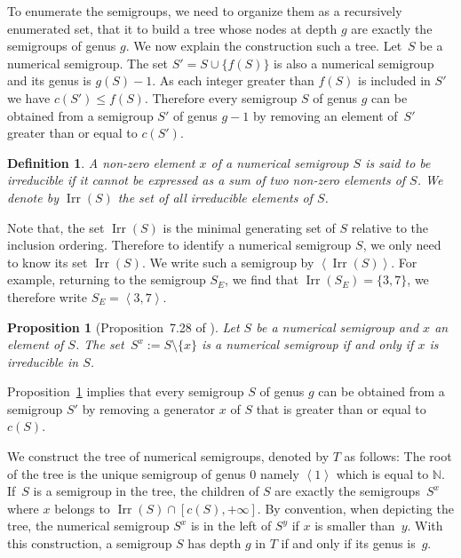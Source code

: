 \documentclass{deliverablereport}
\newcommand{\NN}{\mathbb{N}}
\DeclareMathOperator{\Irr}{Irr}
\newtheorem{defi}{Definition}
\newtheorem{prop}{Proposition}
\begin{document}
%
To enumerate the semigroups, we need to organize them as a recursively
enumerated set, that it to build a tree whose nodes at depth $g$ are exactly
the semigroups of genus $g$.  We now explain the construction such a tree.
Let~$S$ be a numerical semigroup. The set $S'=S\cup\{f(S)\}$ is also a
numerical semigroup and its genus is $g(S)-1$.  As each integer greater than
$f(S)$ is included in $S'$ we have $c(S')\leq f(S)$.  Therefore every
semigroup $S$ of genus $g$ can be obtained from a semigroup $S'$ of genus
$g-1$ by removing an element of~$S'$ greater than or equal to $c(S')$.

\begin{defi}
  A non-zero element $x$ of a numerical semigroup $S$ is said to be
  \emph{irreducible} if it cannot be expressed as a sum of two non-zero
  elements of $S$.  We denote by $\Irr(S)$ the set of all irreducible elements
  of $S$.
\end{defi}
Note that, the set $\Irr(S)$ is the minimal generating set of $S$ relative
to the inclusion ordering. Therefore to identify a numerical semigroup $S$, we
only need to know its set $\Irr(S)$. We write such a semigroup by
$\left<\Irr(S)\right>$. For example, returning to the semigroup $S_E$, we find
that $\Irr(S_E) = \{3, 7\}$, we therefore write $S_E=\left<3,7\right>$.

\begin{prop}[Proposition~7.28 of \cite{BookNS}]
  \label{P:Sx}
  Let $S$ be a numerical semigroup and $x$ an element of $S$. The
  set~$S^x:=S\setminus\{x\}$ is a numerical semigroup if and only if $x$ is
  irreducible in $S$.
\end{prop}
Proposition~\ref{P:Sx} implies that every semigroup $S$ of genus $g$ can be
obtained from a semigroup $S'$ by removing a generator $x$ of $S$ that is
greater than or equal to $c(S)$.

We construct the tree of numerical semigroups, denoted by $T$ as follows: The
root of the tree is the unique semigroup of genus $0$ namely $\left<1\right>$
which is equal to $\NN$.  If~$S$ is a semigroup in the tree, the children of $S$
are exactly the semigroups~$S^x$ where $x$ belongs to
$\Irr(S)\cap[c(S),+\infty]$.  By convention, when depicting the tree, the
numerical semigroup $S^x$ is in the left of $S^y$ if $x$ is smaller than~$y$.
With this construction, a semigroup $S$ has depth $g$ in $T$ if and only if
its genus is~$g$.
\end{document}
